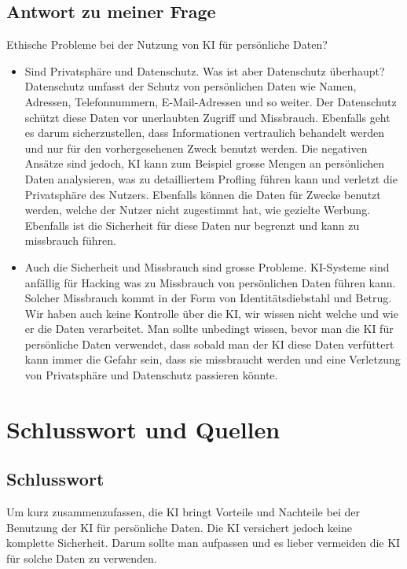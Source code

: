 \documentclass{report}
\begin{document}
\section{Antwort zu meiner Frage}
Ethische Probleme bei der Nutzung von KI für persönliche Daten?
\begin{itemize}
    \item Sind Privatsphäre und Datenschutz. Was ist aber Datenschutz überhaupt? Datenschutz umfasst der Schutz von persönlichen Daten wie Namen, Adressen, Telefonnummern, E-Mail-Adressen und so weiter. Der Datenschutz
    schützt diese Daten vor unerlaubten Zugriff und Missbrauch. Ebenfalls
    geht es darum sicherzustellen, dass Informationen vertraulich behandelt
    werden und nur für den vorhergesehenen Zweck benutzt werden. Die negativen Ansätze sind jedoch, KI kann zum Beispiel grosse Mengen an persönlichen Daten analysieren, was zu detailliertem Profling führen kann
    und verletzt die Privatsphäre des Nutzers. Ebenfalls können die Daten für
    Zwecke benutzt werden, welche der Nutzer nicht zugestimmt hat, wie gezielte Werbung. Ebenfalls ist die Sicherheit für diese Daten nur begrenzt
    und kann zu missbrauch führen. 
    \item Auch die Sicherheit und Missbrauch sind
    grosse Probleme. KI-Systeme sind anfällig für Hacking was zu Missbrauch
    von persönlichen Daten führen kann. Solcher Missbrauch kommt in der
    Form von Identitätsdiebstahl und Betrug. Wir haben auch keine Kontrolle über die KI, wir wissen nicht welche und wie er die Daten verarbeitet.
    Man sollte unbedingt wissen, bevor man die KI für persönliche Daten
    verwendet, dass sobald man der KI diese Daten verfüttert kann immer die
    Gefahr sein, dass sie missbraucht werden und eine Verletzung von Privatsphäre und Datenschutz passieren könnte.
\end{itemize}


\chapter{Schlusswort und Quellen}

\section{Schlusswort}
Um kurz zusammenzufassen, die KI bringt Vorteile und Nachteile bei der Benutzung der KI für persönliche Daten. Die KI versichert jedoch keine komplette Sicherheit. Darum sollte man aufpassen und es lieber vermeiden die KI für solche Daten zu verwenden.
\end{document}

